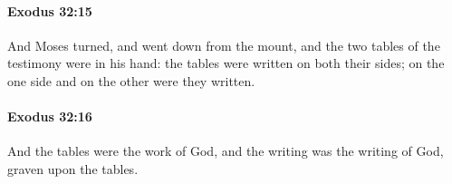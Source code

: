 		\paragraph{Exodus 32:15} %
			\label{EXODUS-32-15}

			And Moses turned, and went down from the mount, and the two tables of the testimony were in his hand: the tables were written on both their sides; on the one side and on the other were they written.


		\paragraph{Exodus 32:16} %
			\label{EXODUS-32-16}

			And the tables were the work of God, and the writing was the writing of God, graven upon the tables.


